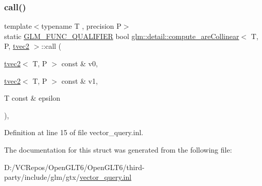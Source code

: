 \subsubsection{\texorpdfstring{call()}{call()}}
{\footnotesize\ttfamily template$<$typename T , precision P$>$ \\
static \mbox{\hyperlink{setup_8hpp_a33fdea6f91c5f834105f7415e2a64407}{G\+L\+M\+\_\+\+F\+U\+N\+C\+\_\+\+Q\+U\+A\+L\+I\+F\+I\+ER}} bool \mbox{\hyperlink{structglm_1_1detail_1_1compute__are_collinear}{glm\+::detail\+::compute\+\_\+are\+Collinear}}$<$ T, P, \mbox{\hyperlink{structglm_1_1tvec2}{tvec2}} $>$\+::call (\begin{DoxyParamCaption}\item[{\mbox{\hyperlink{structglm_1_1tvec2}{tvec2}}$<$ T, P $>$ const \&}]{v0,  }\item[{\mbox{\hyperlink{structglm_1_1tvec2}{tvec2}}$<$ T, P $>$ const \&}]{v1,  }\item[{T const \&}]{epsilon }\end{DoxyParamCaption})\hspace{0.3cm}{\ttfamily [inline]}, {\ttfamily [static]}}



Definition at line 15 of file vector\+\_\+query.\+inl.



The documentation for this struct was generated from the following file\+:\begin{DoxyCompactItemize}
\item 
D\+:/\+V\+C\+Repos/\+Open\+G\+L\+T6/\+Open\+G\+L\+T6/third-\/party/include/glm/gtx/\mbox{\hyperlink{vector__query_8inl}{vector\+\_\+query.\+inl}}\end{DoxyCompactItemize}
